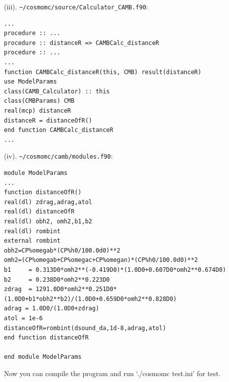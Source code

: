 \documentclass[floatfix,aps,amsmath,nofootinbib,onecolumn,10pt]{revtex4}
\begin{document}
\begin{appendix}
(iii). \verb|~/cosmomc/source/Calculator_CAMB.f90|:
\begin{lstlisting}
...
procedure :: ...
procedure :: distanceR => CAMBCalc_distanceR
procedure :: ...
...
function CAMBCalc_distanceR(this, CMB) result(distanceR)
use ModelParams 
class(CAMB_Calculator) :: this
class(CMBParams) CMB
real(mcp) distanceR
distanceR = distanceOfR()
end function CAMBCalc_distanceR
...
\end{lstlisting}

(iv). \verb|~/cosmomc/camb/modules.f90|:
\begin{lstlisting}
module ModelParams
...
function distanceOfR()
real(dl) zdrag,adrag,atol
real(dl) distanceOfR
real(dl) obh2, omh2,b1,b2
real(dl) rombint
external rombint
obh2=CP%omegab*(CP%h0/100.0d0)**2
omh2=(CP%omegab+CP%omegac+CP%omegan)*(CP%h0/100.0d0)**2
b1     = 0.313D0*omh2**(-0.419D0)*(1.0D0+0.607D0*omh2**0.674D0)
b2     = 0.238D0*omh2**0.223D0
zdrag  = 1291.0D0*omh2**0.251D0*(1.0D0+b1*obh2**b2)/(1.0D0+0.659D0*omh2**0.828D0)
adrag = 1.0D0/(1.0D0+zdrag)
atol = 1e-6
distanceOfR=rombint(dsound_da,1d-8,adrag,atol)
end function distanceOfR

end module ModelParams
\end{lstlisting}

Now you can compile the program and run `./cosmomc test.ini' for test.


\end{appendix}
\end{document}
